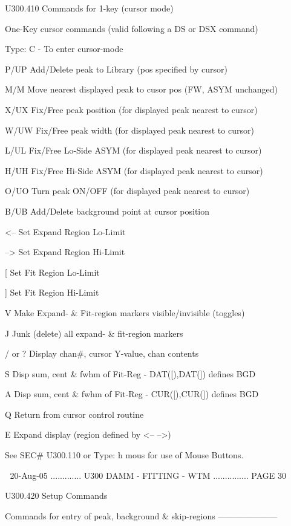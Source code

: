    U300.410  Commands for 1-key (cursor mode)
 
   One-Key cursor commands (valid following a DS or DSX command)
 
   Type: C  - To enter cursor-mode
 
   P/UP   Add/Delete peak to Library (pos specified by cursor)
 
   M/M    Move nearest displayed peak to cusor pos (FW, ASYM unchanged)
 
   X/UX   Fix/Free  peak position (for displayed peak nearest to cursor)
 
   W/UW   Fix/Free  peak width    (for displayed peak nearest to cursor)
 
   L/UL   Fix/Free  Lo-Side ASYM  (for displayed peak nearest to cursor)
 
   H/UH   Fix/Free  Hi-Side ASYM  (for displayed peak nearest to cursor)
 
   O/UO   Turn peak  ON/OFF       (for displayed peak nearest to cursor)
 
   B/UB   Add/Delete background point at cursor position
 
   <--    Set Expand Region   Lo-Limit
 
   -->    Set Expand Region   Hi-Limit
 
   [      Set Fit Region      Lo-Limit
 
   ]      Set Fit Region      Hi-Limit
 
   V      Make Expand- & Fit-region markers visible/invisible (toggles)
 
   J      Junk (delete) all expand- & fit-region markers
 
   / or ? Display chan#, cursor Y-value, chan contents
 
   S      Disp sum, cent & fwhm of Fit-Reg - DAT([),DAT(]) defines BGD
 
   A      Disp sum, cent & fwhm of Fit-Reg - CUR([),CUR(]) defines BGD
 
   Q      Return from cursor control routine
 
   E      Expand display (region defined by <--  -->)
 
 
 
   See SEC# U300.110 or Type: h mous for use of Mouse Buttons.
 
    
   20-Aug-05 ............. U300  DAMM - FITTING - WTM ............... PAGE  30
 
   U300.420  Setup Commands
 
   Commands for entry of peak, background & skip-regions ---------------------
 
